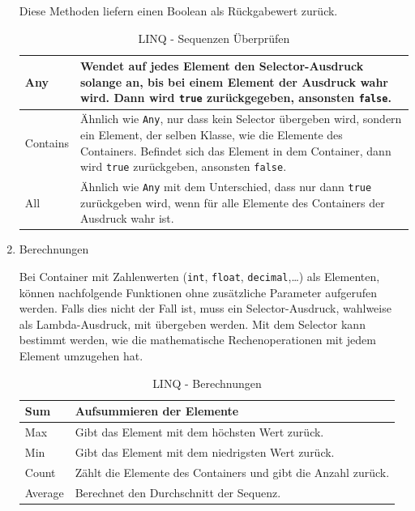 \begin{enumerate}
Diese Methoden liefern einen Boolean als Rückgabewert zurück.

\bigskip
\begin{table}[H]
	\centering
\begin{tabularx}{\textwidth}{|p{130 pt}|X|}
		\hline
Any & Wendet auf jedes Element den Selector-Ausdruck solange an, bis bei einem Element der Ausdruck wahr wird. Dann wird \texttt{true} zurückgegeben, ansonsten \texttt{false}.\\	\hline
Contains & Ähnlich wie \texttt{Any}, nur dass kein Selector übergeben wird, sondern ein Element, der selben Klasse, wie die Elemente des Containers. Befindet sich das Element in dem Container, dann wird \texttt{true} zurückgeben, ansonsten \texttt{false}.\\	\hline
All & Ähnlich wie \texttt{Any} mit dem Unterschied, dass nur dann \texttt{true} zurückgeben wird, wenn für alle Elemente des Containers der Ausdruck wahr ist.\\	\hline
\end{tabularx}
	\medskip
	\caption{LINQ - Sequenzen Überprüfen}
\end{table}

\item Berechnungen

Bei Container mit Zahlenwerten (\texttt{int}, \texttt{float}, \texttt{decimal},\ldots{}) als Elementen,
können nachfolgende Funktionen ohne zusätzliche Parameter aufgerufen werden.
Falls dies nicht der Fall ist, muss ein Selector-Ausdruck, wahlweise als
Lambda-Ausdruck, mit übergeben werden. Mit dem Selector kann bestimmt werden, wie
die mathematische Rechenoperationen mit jedem Element umzugehen hat.

\bigskip
\begin{table}[H]
	\centering
\begin{tabularx}{\textwidth}{|p{130pt}|X|}
	\hline
Sum & Aufsummieren der Elemente\\ 	\hline
Max & Gibt das Element mit dem höchsten Wert zurück.\\	\hline
Min & Gibt das Element mit dem niedrigsten Wert zurück.\\ 	\hline
Count & Zählt die Elemente des Containers und gibt die Anzahl zurück.\\	\hline
Average & Berechnet den Durchschnitt der Sequenz.\\	\hline
\end{tabularx}
	\medskip
	\caption{LINQ - Berechnungen}
\end{table}


\end{enumerate}
